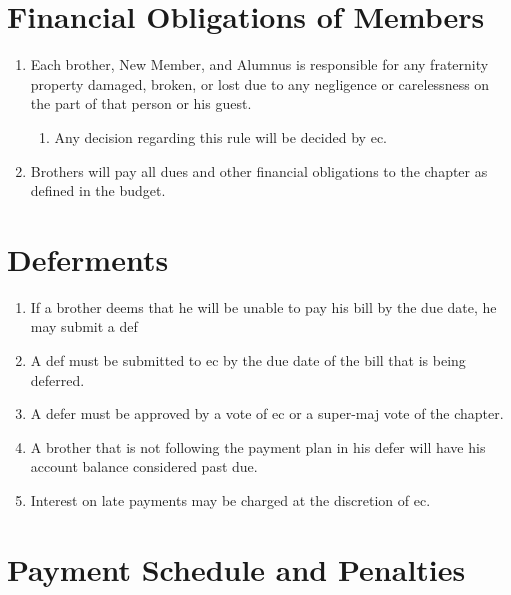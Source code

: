 \section{Financial Obligations of Members}
\label{fin-obligations}

	\begin{enumerate}
		\item Each brother, New Member, and Alumnus is responsible for any fraternity property damaged, broken, or lost due to any negligence or carelessness on the part of that person or his guest. 
		\begin{enumerate}
			\item Any decision regarding this rule will be decided by \gls{ec}.
		\end{enumerate}

		\item Brothers will pay all dues and other financial obligations to the chapter as defined in the budget.

	\end{enumerate}

\section{Deferments}
\label{def}
	\begin{enumerate}
		\item If a brother deems that he will be unable to pay his bill by the due date, he may submit a \gls{def}
		\item A \gls{def} must be submitted to \gls{ec} by the due date of the bill that is being deferred. 
		\item A \gls{defer} must be approved by a vote of \gls{ec} or a \gls{super-maj} vote of the chapter.
		\item A brother that is not following the payment plan in his \gls{defer} will have his account balance considered past due.
		\item Interest on late payments may be charged at the discretion of \gls{ec}.
	\end{enumerate}

\section{Payment Schedule and Penalties}

